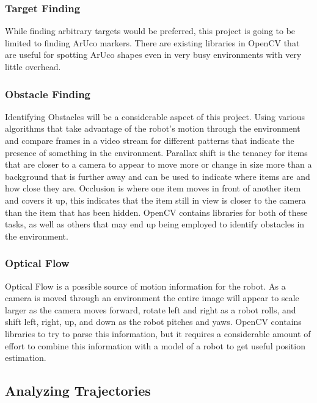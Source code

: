 \documentclass{article}
\begin{document}
		\subsubsection{Target Finding}
		
		While finding arbitrary targets would be preferred, this project is going to be limited to finding ArUco markers. There are existing libraries in OpenCV that are useful for spotting ArUco shapes even in very busy environments with very little overhead. 
		
		\subsubsection{Obstacle Finding}
		
		Identifying Obstacles will be a considerable aspect of this project. Using various algorithms that take advantage of the robot's motion through the environment and compare frames in a video stream for different patterns that indicate the presence of something in the environment. Parallax shift is the tenancy for items that are closer to a camera to appear to move more or change in size more than a background that is further away and can be used to indicate where items are and how close they are. Occlusion is where one item moves in front of another item and covers it up, this indicates that the item still in view is closer to the camera than the item that has been hidden. OpenCV contains libraries for both of these tasks, as well as others that may end up being employed to identify obstacles in the environment.
		
		\subsubsection{Optical Flow}
		
		Optical Flow is a possible source of motion information for the robot. As a camera is moved through an environment the entire image will appear to scale larger as the camera moves forward, rotate left and right as a robot rolls, and shift left, right, up, and down as the robot pitches and yaws. OpenCV contains libraries to try to parse this information, but it requires a considerable amount of effort to combine this information with a model of a robot to get useful position estimation.
	
	\subsection{Analyzing Trajectories}
	
\end{document}
